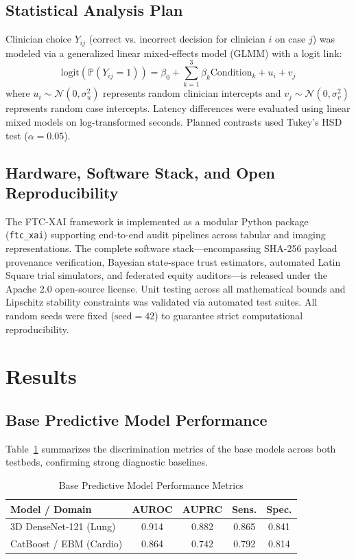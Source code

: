\documentclass[10pt,journal,compsoc]{IEEEtran}
\begin{document}
\subsection{Statistical Analysis Plan}
Clinician choice $Y_{ij}$ (correct vs. incorrect decision for clinician $i$ on case $j$) was modeled via a generalized linear mixed-effects model (GLMM) with a logit link:
\begin{equation}
\text{logit}(\mathbb{P}(Y_{ij} = 1)) = \beta_0 + \sum_{k=1}^3 \beta_k \text{Condition}_{k} + u_i + v_j
\end{equation}
where $u_i \sim \mathcal{N}(0, \sigma_u^2)$ represents random clinician intercepts and $v_j \sim \mathcal{N}(0, \sigma_v^2)$ represents random case intercepts. Latency differences were evaluated using linear mixed models on log-transformed seconds. Planned contrasts used Tukey's HSD test ($\alpha = 0.05$).

\subsection{Hardware, Software Stack, and Open Reproducibility}
The FTC-XAI framework is implemented as a modular Python package (\texttt{ftc\_xai}) supporting end-to-end audit pipelines across tabular and imaging representations. The complete software stack---encompassing SHA-256 payload provenance verification, Bayesian state-space trust estimators, automated Latin Square trial simulators, and federated equity auditors---is released under the Apache 2.0 open-source license. Unit testing across all mathematical bounds and Lipschitz stability constraints was validated via automated test suites. All random seeds were fixed ($\text{seed} = 42$) to guarantee strict computational reproducibility.

\section{Results}

\subsection{Base Predictive Model Performance}
Table~\ref{tab:model_perf} summarizes the discrimination metrics of the base models across both testbeds, confirming strong diagnostic baselines.

\begin{table}[htbp]
\caption{Base Predictive Model Performance Metrics}
\label{tab:model_perf}
\centering
\begin{tabular}{lcccc}
\toprule
Model / Domain & AUROC & AUPRC & Sens. & Spec. \\
\midrule
3D DenseNet-121 (Lung) & 0.914 & 0.882 & 0.865 & 0.841 \\
CatBoost / EBM (Cardio) & 0.864 & 0.742 & 0.792 & 0.814 \\
\bottomrule
\end{tabular}
\end{table}
\end{document}
